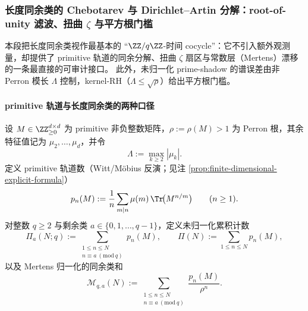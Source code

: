 
\subsubsection{长度同余类的 Chebotarev 与 Dirichlet--Artin 分解：root-of-unity 滤波、扭曲 \texorpdfstring{$\zeta$}{zeta} 与平方根门槛}\label{subsubsec:zeta-online-kernel-length-modq-chebotarev}
本段把长度同余类视作最基本的 ``\(\ZZ/q\ZZ\)-时间 cocycle''：它不引入额外观测量，却提供了 primitive 轨道的同余分解、扭曲 \(\zeta\) 扇区与常数层（Mertens）漂移的一条最直接的可审计接口。
此外，未归一化 prime-shadow 的谱误差由非 Perron 模长 \(\Lambda\) 控制，kernel-RH（\(\Lambda\le\sqrt{\rho}\)）给出平方根门槛。

\paragraph{primitive 轨道与长度同余类的两种口径}
设 \(M\in\ZZ_{\ge0}^{d\times d}\) 为 primitive 非负整数矩阵，\(\rho:=\rho(M)>1\) 为 Perron 根，其余特征值记为 \(\mu_2,\dots,\mu_d\)，并令
\[
\Lambda:=\max_{k\ge2}|\mu_k|.
\]
定义 primitive 轨道数（Witt/Möbius 反演；见注 \ref{prop:finite-dimensional-explicit-formula}）
\[
p_n(M):=\frac{1}{n}\sum_{m\mid n}\mu(m)\,\Tr\!\bigl(M^{n/m}\bigr)\qquad(n\ge1).
\]
对整数 \(q\ge2\) 与剩余类 \(a\in\{0,1,\dots,q-1\}\)，定义未归一化累积计数
\[
\Pi_a(N;q):=\sum_{\substack{1\le n\le N\\ n\equiv a\ (\mathrm{mod}\ q)}} p_n(M),
\qquad
\Pi(N):=\sum_{1\le n\le N}p_n(M),
\]
以及 Mertens 归一化的同余类和
\[
\mathcal{M}_{q,a}(N):=\sum_{\substack{1\le n\le N\\ n\equiv a\ (\mathrm{mod}\ q)}}\frac{p_n(M)}{\rho^{n}}.
\]

